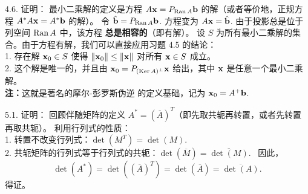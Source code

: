 \begin{exer}
4.6. 证明：
最小二乘解的定义是方程 $A\mathbf{x} = P_{\operatorname{Ran} A} \mathbf{b}$ 的解（或者等价地，正规方程 $A^* A \mathbf{x} = A^* \mathbf{b}$ 的解）。
令 $\hat{\mathbf{b}} = P_{\operatorname{Ran} A} \mathbf{b}$. 方程变为 $A\mathbf{x} = \hat{\mathbf{b}}$.
由于投影总是位于列空间 $\operatorname{Ran} A$ 中，该方程 \textbf{总是相容的}（即有解）。
设 $S$ 为所有最小二乘解的集合。由于方程有解，我们可以直接应用习题 4.5 的结论：\\
1. 存在解 $\mathbf{x}_0 \in S$ 使得 $\|\mathbf{x}_0\| \le \|\mathbf{x}\|$ 对所有 $\mathbf{x} \in S$ 成立。\\
2. 这个解是唯一的，并且由 $\mathbf{x}_0 = P_{(\operatorname{Ker} A)^\perp} \mathbf{x}$ 给出，其中 $\mathbf{x}$ 是任意一个最小二乘解。\\
\textbf{注：}这就是著名的摩尔-彭罗斯伪逆 的定义基础，记为 $\mathbf{x}_0 = A^+ \mathbf{b}$.


\vspace{5ex}

5.1. 证明：
回顾伴随矩阵的定义 $A^* = (\overline{A})^T$（即先取共轭再转置，或者先转置再取共轭）。
利用行列式的性质：\\
1. 转置不改变行列式：$\det(M^T) = \det(M)$.~\\
2. 共轭矩阵的行列式等于行列式的共轭：$\det(\overline{M}) = \overline{\det(M)}$.~
因此，
$$ \det(A^*) = \det((\overline{A})^T) = \det(\overline{A}) = \overline{\det(A)}. $$
得证。


\end{exer}
